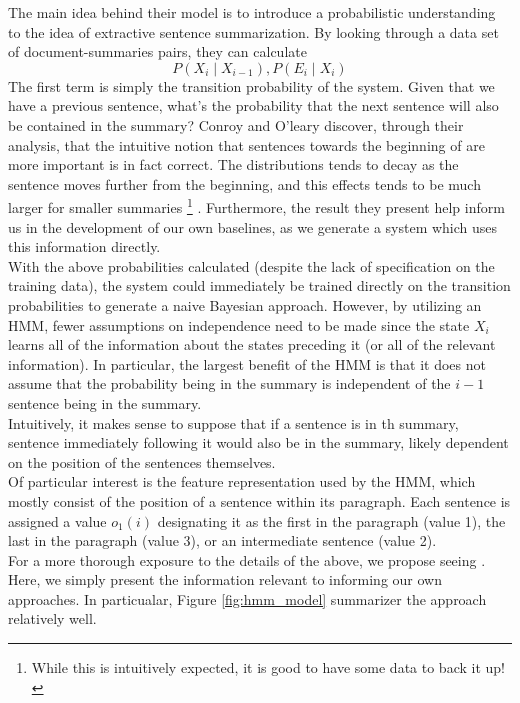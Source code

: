 \documentclass[11pt]{article}
\begin{document}
The main idea behind their model is to introduce a probabilistic understanding to the idea of extractive sentence summarization. By looking through a data set of document-summaries pairs, they can calculate
$$
P(X_i \mid X_{i-1}), P(E_i \mid X_i)
$$
The first term is simply the transition probability of the system. Given that we have a previous sentence, what's the probability that the next sentence will also be contained in the summary? Conroy and O'leary discover, through their analysis, that the intuitive notion that sentences towards the beginning of are more important is in fact correct. The distributions tends to decay as the sentence moves further from the beginning, and this effects tends to be much larger for smaller summaries \footnote{While this is intuitively expected, it is good to have some data to back it up!} \cite{hmm_summary}. Furthermore, the result they present help inform us in the development of our own baselines, as we generate a system which uses this information directly. \\

With the above probabilities calculated (despite the lack of specification on the training data), the system could immediately be trained directly on the transition probabilities to generate a naive Bayesian approach. However, by utilizing an HMM, fewer assumptions on independence need to be made since the state $X_i$ learns all of the information about the states preceding it (or all of the relevant information). In particular, the largest benefit of the HMM is that it does not assume that the probability being in the summary is independent of the $i-1$ sentence being in the summary. \\

Intuitively, it makes sense to suppose that if a sentence is in th summary, sentence immediately following it would also be in the summary, likely dependent on the position of the sentences themselves. \\

Of particular interest is the feature representation used by the HMM, which mostly consist of the position of a sentence within its paragraph. Each sentence is assigned  a value $o_1(i)$ designating it as the first in the paragraph (value 1), the last in the paragraph (value $3$), or an intermediate sentence (value 2). \\

For a more thorough exposure to the details of the above, we propose seeing \cite{hmm_summary}. Here, we simply present the information relevant to informing our own approaches. In particualar, Figure \ref{fig:hmm_model} summarizer the approach relatively well.
\end{document}
